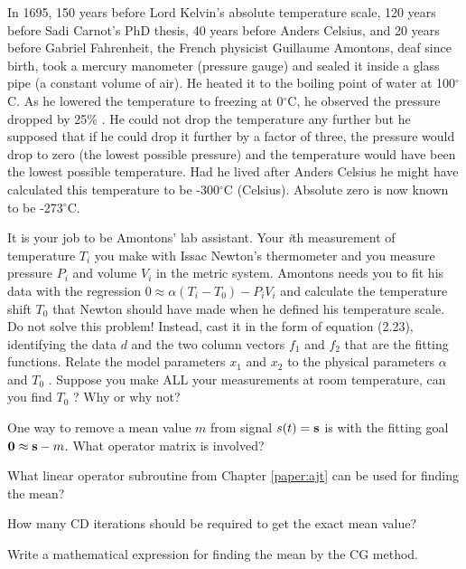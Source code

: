 \begin{exer}
\item In 1695,
150 years before Lord Kelvin's absolute temperature scale,
120 years before Sadi Carnot's PhD thesis,
40 years before Anders Celsius,
and 20 years before Gabriel Fahrenheit,
the French physicist Guillaume Amontons,
deaf  since birth,
took a mercury manometer (pressure gauge) and sealed it inside a glass pipe (a constant volume of air).
He heated it to the boiling point of water at 100$^\circ$C.
As he lowered the temperature to freezing at 0$^\circ$C,
he observed the pressure dropped by 25\% .
He could not drop the temperature any further but he supposed that if he could drop it further by a factor of three,
the pressure would drop to zero (the lowest possible pressure) and the temperature would have been the lowest possible temperature.
Had he lived after Anders Celsius he might have calculated this temperature to be -300$^\circ$C (Celsius).
Absolute  zero is now known to be -273$^\circ$C.
\par
It is your job to be Amontons' lab assistant.
Your {\it i}th measurement of temperature $T_i$ you make with Issac Newton's thermometer and you measure pressure $P_i$ and volume $V_i$ in the metric system.
Amontons needs you to fit his data with the regression $0 \approx \alpha (T_i - T_0 ) - P_i V_i$ and calculate the temperature shift $T_0$ that Newton should have made when he defined his temperature scale.
Do not solve this problem!
Instead,
cast it in the form of equation (2.23),
identifying the data $d$ and the two column vectors $f_1$ and $f_2$ that are the fitting functions.
Relate the model parameters $x_1$ and $x_2$ to the physical parameters $\alpha$ and $T_0$ .
Suppose you make ALL your measurements at room temperature,
can you find $T_0$ ?
Why or why not? 

\item
One way to remove a mean value $m$ from signal $s(t)= \bold s$
is with the fitting goal $\bold 0 \approx \bold s - m$.
What operator matrix is involved?

\item
What linear operator subroutine from Chapter \ref{paper:ajt}
can be used for finding the mean?

\item
How many CD iterations should be required to get the exact mean value?

\item
Write a mathematical expression for finding the mean by the CG method.

\end{exer}


\clearpage

